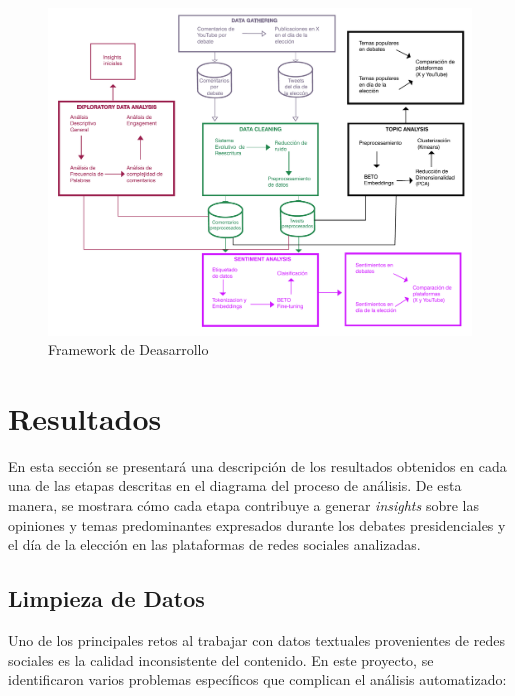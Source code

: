 \documentclass[10pt, a4paper]{article}
\begin{document}
	\begin{figure}[h!] %
		\centering
		\includegraphics[width=1\textwidth]{diagrama.pdf} %
		\caption{Framework de Deasarrollo} %
		\label{fig:framework} %
	\end{figure}
	
	
	\section{Resultados}
	
	En esta sección se presentará una descripción de los resultados obtenidos en cada una de las etapas descritas en el diagrama del proceso de análisis. De esta manera, se mostrara cómo cada etapa contribuye a generar \textit{insights} sobre las opiniones y temas predominantes expresados durante los debates presidenciales y el día de la elección en las plataformas de redes sociales analizadas.
	
	\subsection{Limpieza de Datos}
	
	Uno de los principales retos al trabajar con datos textuales provenientes de redes sociales es la calidad inconsistente del contenido. En este proyecto, se identificaron varios problemas específicos que complican el análisis automatizado:
	
\end{document}
